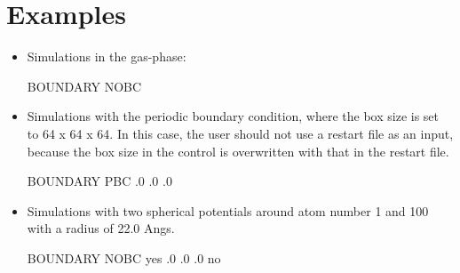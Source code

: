 \documentclass[a4paper,11pt,oneside,english]{sphinxmanual}
\begin{document}
\section{Examples}
\label{\detokenize{10_Boundary:examples}}\begin{itemize}
\item {} 
Simulations in the gas-phase:

\begin{sphinxVerbatim}[commandchars=\\\{\}]
\PYG{o}{[}BOUNDARY\PYG{o}{]}
        NOBC      
\end{sphinxVerbatim}

\item {} 
Simulations with the periodic boundary condition, where the
box size is set to 64 x 64 x 64.
In this case, the user should not use a restart file as an input,
because the box size in the control is overwritten with that in the restart file.

\begin{sphinxVerbatim}[commandchars=\\\{\}]
\PYG{o}{[}BOUNDARY\PYG{o}{]}
        PBC       
  .0      
  .0      
  .0      
\end{sphinxVerbatim}

\item {} 
Simulations with two spherical potentials around atom number 1 and 100 with a radius of 22.0 Angs.

\begin{sphinxVerbatim}[commandchars=\\\{\}]
\PYG{o}{[}BOUNDARY\PYG{o}{]}
           NOBC
  yes
       .0
       
         
  
        .0
      .0
        no


\end{sphinxVerbatim}
\end{itemize}
\end{document}
